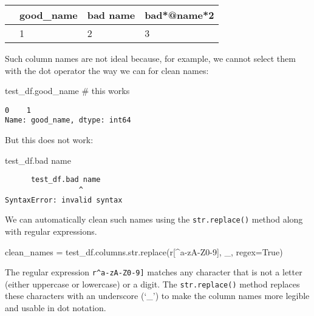 \documentclass[
  letterpaper,
  DIV=11,
  numbers=noendperiod]{scrreprt}
\newenvironment{Shaded}{\begin{snugshade}}{\end{snugshade}}
\newcommand{\BuiltInTok}[1]{\textcolor[rgb]{0.00,0.23,0.31}{#1}}
\newcommand{\CommentTok}[1]{\textcolor[rgb]{0.37,0.37,0.37}{#1}}
\newcommand{\NormalTok}[1]{\textcolor[rgb]{0.00,0.23,0.31}{#1}}
\newcommand{\OperatorTok}[1]{\textcolor[rgb]{0.37,0.37,0.37}{#1}}
\newcommand{\StringTok}[1]{\textcolor[rgb]{0.13,0.47,0.30}{#1}}
\newcommand{\VariableTok}[1]{\textcolor[rgb]{0.07,0.07,0.07}{#1}}
\newcommand{\VerbatimStringTok}[1]{\textcolor[rgb]{0.13,0.47,0.30}{#1}}
\begin{document}
\begin{longtable}[]{@{}llll@{}}
\toprule\noalign{}
& good\_name & bad name & bad*@name*2 \\
\midrule\noalign{}
\endhead
\bottomrule\noalign{}
\endlastfoot
0 & 1 & 2 & 3 \\
\end{longtable}

Such column names are not ideal because, for example, we cannot select
them with the dot operator the way we can for clean names:

\begin{Shaded}
\begin{Highlighting}[]
\NormalTok{test\_df.good\_name  }\CommentTok{\# this works}
\end{Highlighting}
\end{Shaded}

\begin{verbatim}
0    1
Name: good_name, dtype: int64
\end{verbatim}

But this does not work:

\begin{Shaded}
\begin{Highlighting}[]
\NormalTok{test\_df.bad name}
\end{Highlighting}
\end{Shaded}

\begin{verbatim}
      test_df.bad name
                 ^
SyntaxError: invalid syntax
\end{verbatim}

We can automatically clean such names using the \texttt{str.replace()}
method along with regular expressions.

\begin{Shaded}
\begin{Highlighting}[]
\NormalTok{clean\_names }\OperatorTok{=}\NormalTok{ test\_df.columns.}\BuiltInTok{str}\NormalTok{.replace(}\VerbatimStringTok{r\textquotesingle{}[\^{}a{-}zA{-}Z0{-}9]\textquotesingle{}}\NormalTok{, }\StringTok{\textquotesingle{}\_\textquotesingle{}}\NormalTok{, regex}\OperatorTok{=}\VariableTok{True}\NormalTok{)}
\end{Highlighting}
\end{Shaded}

The regular expression
\texttt{r\textquotesingle{}{[}\^{}a-zA-Z0-9{]}\textquotesingle{}}
matches any character that is not a letter (either uppercase or
lowercase) or a digit. The \texttt{str.replace()} method replaces these
characters with an underscore (`\_') to make the column names more
legible and usable in dot notation.
\end{document}
